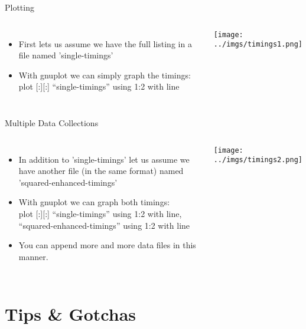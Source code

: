 \documentclass{beamer}
\begin{document}
\begin{frame}{Plotting}
\begin{columns}
\begin{itemize}
\item First lets us assume we have the full listing in a file named 'single-timings'
\item With gnuplot we can simply graph the timings: \\
plot [:][:] ``single-timings'' using 1:2 with line
\end{itemize}
\texttt{[image: ../imgs/timings1.png]}
\end{columns}
\end{frame}

\begin{frame}{Multiple Data Collections}
\begin{columns}
\begin{itemize}
\item In addition to 'single-timings' let us assume we have another file (in the same format) named 'squared-enhanced-timings'
\item With gnuplot we can graph both timings: \\
plot [:][:] ``single-timings'' using 1:2 with line, ``squared-enhanced-timings'' using 1:2 with line
\item {\tiny You can append more and more data files in this manner.}
\end{itemize}
\texttt{[image: ../imgs/timings2.png]}
\end{columns}
\end{frame}

\section{Tips \& Gotchas}
\subsection{}
\end{document}
